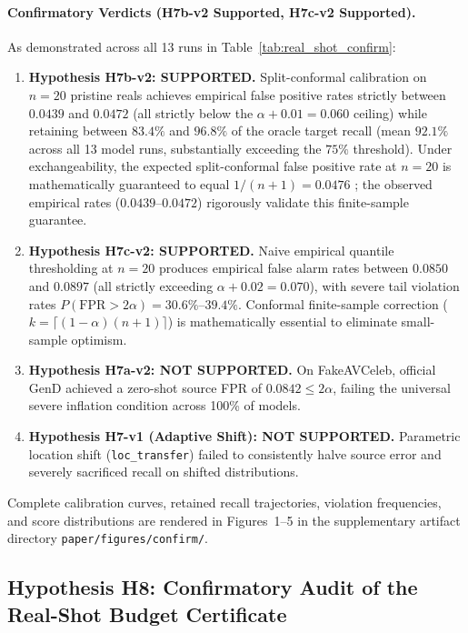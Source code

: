 \paragraph{Confirmatory Verdicts (H7b-v2 Supported, H7c-v2 Supported).}
As demonstrated across all 13 runs in Table~\ref{tab:real_shot_confirm}:
\begin{enumerate}[leftmargin=*]
    \item \textbf{Hypothesis H7b-v2: SUPPORTED.} Split-conformal calibration on $n=20$ pristine reals achieves empirical false positive rates strictly between $\mathbf{0.0439}$ and $\mathbf{0.0472}$ (all strictly below the $\alpha + 0.01 = 0.060$ ceiling) while retaining between $\mathbf{83.4\%}$ and $\mathbf{96.8\%}$ of the oracle target recall (mean $92.1\%$ across all 13 model runs, substantially exceeding the $75\%$ threshold). Under exchangeability, the expected split-conformal false positive rate at $n=20$ is mathematically guaranteed to equal $1/(n+1) = 0.0476$ \citep{angelopoulos2021gentle}; the observed empirical rates ($0.0439\text{--}0.0472$) rigorously validate this finite-sample guarantee.
    \item \textbf{Hypothesis H7c-v2: SUPPORTED.} Naive empirical quantile thresholding at $n=20$ produces empirical false alarm rates between $\mathbf{0.0850}$ and $\mathbf{0.0897}$ (all strictly exceeding $\alpha + 0.02 = 0.070$), with severe tail violation rates $P(\text{FPR} > 2\alpha) = 30.6\%\text{--}39.4\%$. Conformal finite-sample correction ($k = \lceil(1-\alpha)(n+1)\rceil$) is mathematically essential to eliminate small-sample optimism.
    \item \textbf{Hypothesis H7a-v2: NOT SUPPORTED.} On FakeAVCeleb, official GenD achieved a zero-shot source FPR of $0.0842 \le 2\alpha$, failing the universal severe inflation condition across 100\% of models.
    \item \textbf{Hypothesis H7-v1 (Adaptive Shift): NOT SUPPORTED.} Parametric location shift (\texttt{loc\_transfer}) failed to consistently halve source error and severely sacrificed recall on shifted distributions.
\end{enumerate}
Complete calibration curves, retained recall trajectories, violation frequencies, and score distributions are rendered in Figures~1--5 in the supplementary artifact directory \texttt{paper/figures/confirm/}.

\subsection{Hypothesis H8: Confirmatory Audit of the Real-Shot Budget Certificate}
\label{sec:h8_audit}

